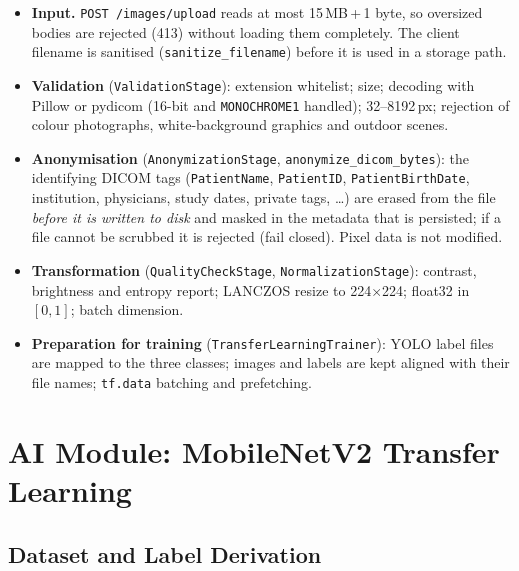 \documentclass[12pt,a4paper]{article}
\newcommand{\fp}[1]{\nolinkurl{#1}}
\begin{document}
\begin{itemize}[leftmargin=*]
    \item \textbf{Input.} \texttt{POST /images/upload} reads at most 15\,MB\,+\,1 byte, so oversized bodies
          are rejected (413) without loading them completely. The client filename is sanitised
          (\texttt{sanitize\_filename}) before it is used in a storage path.
    \item \textbf{Validation} (\texttt{ValidationStage}): extension whitelist; size; decoding with Pillow or
          pydicom (16-bit and \texttt{MONOCHROME1} handled); 32--8192\,px; rejection of colour photographs,
          white-background graphics and outdoor scenes.
    \item \textbf{Anonymisation} (\fp{AnonymizationStage}, \fp{anonymize_dicom_bytes}): the identifying DICOM tags
          (\texttt{PatientName}, \texttt{PatientID}, \texttt{PatientBirthDate}, institution, physicians, study
          dates, private tags, \ldots) are erased from the file \emph{before it is written to disk} and masked in
          the metadata that is persisted; if a file cannot be scrubbed it is rejected (fail closed). Pixel data is
          not modified.
    \item \textbf{Transformation} (\texttt{QualityCheckStage}, \fp{NormalizationStage}): contrast,
          brightness and entropy report; LANCZOS resize to 224$\times$224; float32 in $[0,1]$; batch dimension.
    \item \textbf{Preparation for training} (\fp{TransferLearningTrainer}): YOLO label files are mapped to
          the three classes; images and labels are kept aligned with their file names; \texttt{tf.data}
          batching and prefetching.
\end{itemize}

\section{AI Module: MobileNetV2 Transfer Learning}

\subsection{Dataset and Label Derivation}
\end{document}
